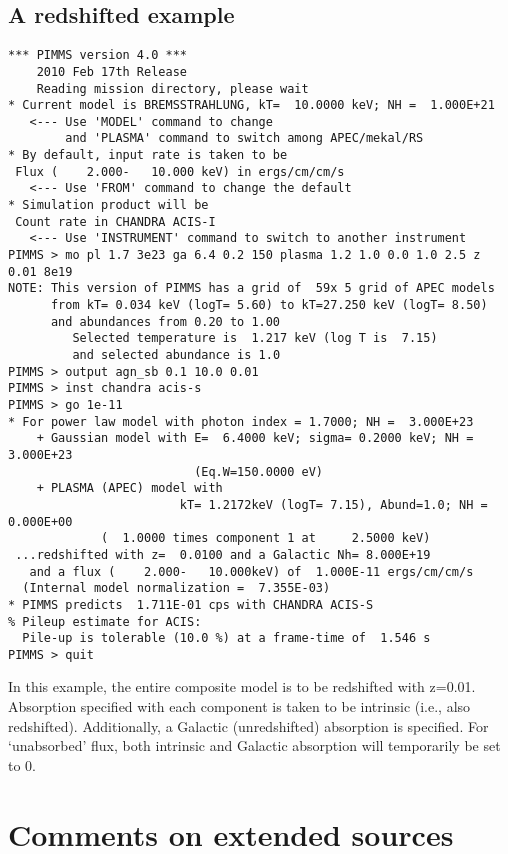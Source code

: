 \documentclass[11pt]{article}
\begin{document}
\subsection{A redshifted example}

\begin{verbatim}
*** PIMMS version 4.0 ***
    2010 Feb 17th Release
    Reading mission directory, please wait
* Current model is BREMSSTRAHLUNG, kT=  10.0000 keV; NH =  1.000E+21
   <--- Use 'MODEL' command to change
        and 'PLASMA' command to switch among APEC/mekal/RS
* By default, input rate is taken to be
 Flux (    2.000-   10.000 keV) in ergs/cm/cm/s
   <--- Use 'FROM' command to change the default
* Simulation product will be
 Count rate in CHANDRA ACIS-I
   <--- Use 'INSTRUMENT' command to switch to another instrument
PIMMS > mo pl 1.7 3e23 ga 6.4 0.2 150 plasma 1.2 1.0 0.0 1.0 2.5 z 0.01 8e19
NOTE: This version of PIMMS has a grid of  59x 5 grid of APEC models
      from kT= 0.034 keV (logT= 5.60) to kT=27.250 keV (logT= 8.50)
      and abundances from 0.20 to 1.00
         Selected temperature is  1.217 keV (log T is  7.15)
         and selected abundance is 1.0
PIMMS > output agn_sb 0.1 10.0 0.01
PIMMS > inst chandra acis-s
PIMMS > go 1e-11
* For power law model with photon index = 1.7000; NH =  3.000E+23
    + Gaussian model with E=  6.4000 keV; sigma= 0.2000 keV; NH =  3.000E+23
                          (Eq.W=150.0000 eV)
    + PLASMA (APEC) model with
                        kT= 1.2172keV (logT= 7.15), Abund=1.0; NH =  0.000E+00
             (  1.0000 times component 1 at     2.5000 keV)
 ...redshifted with z=  0.0100 and a Galactic Nh= 8.000E+19
   and a flux (    2.000-   10.000keV) of  1.000E-11 ergs/cm/cm/s
  (Internal model normalization =  7.355E-03)
* PIMMS predicts  1.711E-01 cps with CHANDRA ACIS-S
% Pileup estimate for ACIS:
  Pile-up is tolerable (10.0 %) at a frame-time of  1.546 s
PIMMS > quit
\end{verbatim}

In this example, the entire composite model is to be redshifted with z=0.01.
Absorption specified with each component is taken to be intrinsic (i.e.,
also redshifted).  Additionally, a Galactic (unredshifted) absorption is
specified.  For `unabsorbed' flux, both intrinsic and Galactic absorption
will temporarily be set to 0.

\section{Comments on extended sources}
\end{document}

